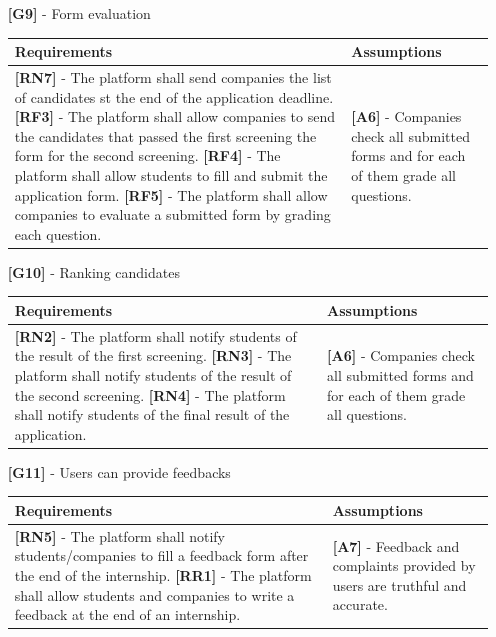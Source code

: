 \documentclass[11pt,twoside]{article}
\begin{document}
\begin{itemize}
\item[\textbf{[G9]}] - Form evaluation
\begin{table}[H]
\begin{tabular}{| p{} | p{} |}
\hline
\textbf{Requirements} & \textbf{Assumptions} \\
\hline
\textbf{[RN7]} - The platform shall send companies the list of candidates st the end of the application deadline. \newline
\textbf{[RF3]} - The platform shall allow companies to send the candidates that passed the first screening the form for the second screening. \newline
\textbf{[RF4]} - The platform shall allow students to fill and submit the application form. \newline
\textbf{[RF5]} - The platform shall allow companies to evaluate a submitted form by grading each question.
& \textbf{[A6]} - Companies check all submitted forms and for each of them grade all questions. \\
\hline
\end{tabular}
\end{table}

\item[\textbf{[G10]}] - Ranking candidates
\begin{table}[H]
\begin{tabular}{| p{} | p{} |}
\hline
\textbf{Requirements} & \textbf{Assumptions} \\
\hline
\textbf{[RN2]} - The platform shall notify students of the result of the first screening. \newline
\textbf{[RN3]} - The platform shall notify students of the result of the second screening. \newline
\textbf{[RN4]} - The platform shall notify students of the final result of the application.
& \textbf{[A6]} - Companies check all submitted forms and for each of them grade all questions. \\
\hline
\end{tabular}
\end{table}

\item[\textbf{[G11]}] - Users can provide feedbacks
\begin{table}[H]
\begin{tabular}{| p{} | p{} |}
\hline
\textbf{Requirements} & \textbf{Assumptions} \\
\hline
\textbf{[RN5]} - The platform shall notify students/companies to fill a feedback form after the end of the internship. \newline
\textbf{[RR1]} - The platform shall allow students and companies to write a feedback at the end of an internship.
& \textbf{[A7]} - Feedback and complaints provided by users are truthful and accurate. \\
\hline
\end{tabular}
\end{table}


\end{itemize}
\end{document}
